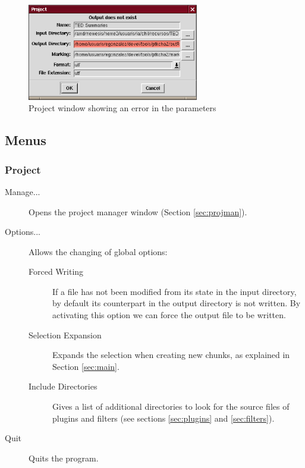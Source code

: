\documentclass{article}
\begin{document}
\begin{figure}[ht]
\begin{center}

\includegraphics[width=75mm]{img/project-error.eps}

\caption{Project window showing an error in the parameters}
\label{fig:projerror}
\end{center}
\end{figure}

\subsection{Menus}
\subsubsection{Project}
\label{sec:project}
\begin{description}
\item[Manage...] Opens the project manager window (Section
\ref{sec:projman}).
\item[Options...] Allows the changing of global options:
\begin{description}
\item [Forced Writing] If a file has not been modified from its state
in the input directory, by default its counterpart in the output
directory is not written. By activating this option we can force the
output file to be written.
\item [Selection Expansion] Expands the selection when creating new
chunks, as explained in Section \ref{sec:main}.
\item [Include Directories] Gives a list of additional directories to
look for the source files of plugins and filters (see sections
\ref{sec:plugins} and \ref{sec:filters}).
\end{description}
\item[Quit] Quits the program.
\end{description}
\end{document}

